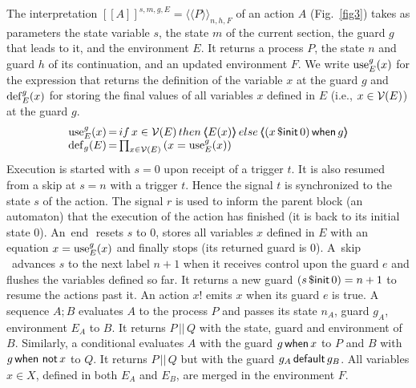 \documentclass[copyright,creativecommons]{eptcs}
\newcommand{\V}{{\cal V}}
\newcommand{\vars}{\V}
\newcommand{\op}[1]{{\sf #1}}
\newcommand{\false}{0}
\newcommand{\kw}[1]{{{\,\op{#1}\,}}}
\newcommand{\Not}{\kw{not}}
\newcommand{\Pre}{\kw{\$ init}}
\newcommand{\Default}{\kw{default}}
\newcommand{\When}{\kw{when}}
\newcommand{\Par}{{\,|\!\!|\,}}
\newcommand{\Def}{{\rm{def}}}
\newcommand{\Use}{{\rm{use}}}
\newcommand{\Sq}[1]{{[\![{#1}]\!]}}
\renewcommand{\:}{{:}}
\newcommand{\sq}[1]{\langle\!\!\langle{#1}\rangle\!\!\rangle}
\newcommand{\Skip}{{\kw{skip}}}
\newcommand{\End}{{\kw{end}}}
\begin{document}
The interpretation $\Sq{A}^{s,m,g,E}=\sq{P}_{n,h,F}$ of an action $A$ (Fig.~\ref{fig3}) takes as parameters the state variable $s$, the state $m$ of the current section, the guard $g$ that leads to it, and the environment $E$. It returns a process $P$, the state $n$ and guard $h$ of its continuation, and an updated environment $F$. We write $\Use^g_E(x)$ for the expression that returns the definition of the variable $x$ at the guard $g$ and $\Def^g_E(x)$ for storing the final values of all variables $x$ defined in $E$ (i.e., $x\in\vars(E)$) at the guard $g$.
\[
\begin{array}{@{}r@{\,}c@{\,}l@{}}
\Use^g_E(x)&=&if\,x\in\vars(E)\,then\,\sq{E(x)}\,else\,\sq{(x\Pre 0)\When g}\\
\Def_{g}(E)&=&\prod_{x\in\vars(E)}\left(x=\Use^g_E(x)\right)
\end{array}
\]
Execution is started with $s=0$ upon receipt of a trigger $t$. It is also resumed from a skip  at $s=n$ with a trigger $t$. Hence the signal $t$ is synchronized to the state $s$ of the action.  The signal $r$ is used to inform the parent block (an automaton) that the execution of the action has finished (it is back to its initial state $0$).  An \End\  resets $s$ to $0$, stores all variables $x$ defined in $E$ with an equation $x=\Use^g_E(x)$ and finally stops (its returned guard is \false). 
A \Skip\  advances $s$ to the next label $n+1$ when it receives control upon the guard $e$ and flushes the variables defined so far. It returns a new guard $(s\Pre 0)=n+1$ to resume the actions past it. An action $x!$ emits $x$ when its guard $e$ is true. A sequence $A;B$ evaluates $A$ to the process $P$ and passes its state $n_A$, guard $g_A$, environment $E_A$ to $B$. It returns $P\Par Q$ with the state, guard and environment of $B$.
Similarly, a conditional evaluates $A$ with the guard ${g\When x}$ to $P$ and $B$ with ${g\When\Not x}$ to $Q$. It returns $P\Par Q$ but with the guard $g_A\Default g_B$. All variables $x\in X$, defined in both $E_A$ and $E_B$, are merged in the environment $F$.
\end{document}
